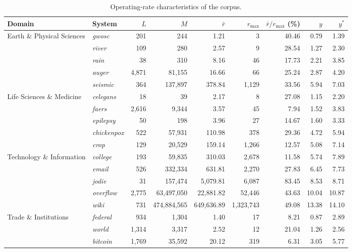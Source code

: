 \documentclass{article}
\begin{document}
\clearpage
\begin{table}[H]
\centering
\footnotesize
\captionsetup{position=top,skip=12pt}
\caption{Operating-rate characteristics of the corpus.}
\label{tab:si-rates}
\begin{tabularx}{\linewidth}{@{}Xlrrrrrrr@{}}
\toprule
Domain & System & $L$ & $M$ & $\bar{r}$ & $r_{\max}$ & $\bar{r}/r_{\max}$ (\%) & $y$ & $y^{*}$ \\
\midrule
Earth \& Physical Sciences & \textit{gwosc} & 201 & 244 & 1.21 & 3 & 40.46 & 0.79 & 1.39 \\
 & \textit{river} & 109 & 280 & 2.57 & 9 & 28.54 & 1.27 & 2.30 \\
 & \textit{rain} & 38 & 310 & 8.16 & 46 & 17.73 & 2.21 & 3.85 \\
 & \textit{auger} & 4{,}871 & 81{,}155 & 16.66 & 66 & 25.24 & 2.87 & 4.20 \\
 & \textit{seismic} & 364 & 137{,}897 & 378.84 & 1{,}129 & 33.56 & 5.94 & 7.03 \\
\addlinespace
Life Sciences \& Medicine & \textit{celegans} & 18 & 39 & 2.17 & 8 & 27.08 & 1.15 & 2.20 \\
 & \textit{faers} & 2{,}616 & 9{,}344 & 3.57 & 45 & 7.94 & 1.52 & 3.83 \\
 & \textit{epilepsy} & 50 & 198 & 3.96 & 27 & 14.67 & 1.60 & 3.33 \\
 & \textit{chickenpox} & 522 & 57{,}931 & 110.98 & 378 & 29.36 & 4.72 & 5.94 \\
 & \textit{crop} & 129 & 20{,}529 & 159.14 & 1{,}266 & 12.57 & 5.08 & 7.14 \\
\addlinespace
Technology \& Information & \textit{college} & 193 & 59{,}835 & 310.03 & 2{,}678 & 11.58 & 5.74 & 7.89 \\
 & \textit{email} & 526 & 332{,}334 & 631.81 & 2{,}270 & 27.83 & 6.45 & 7.73 \\
 & \textit{jodie} & 31 & 157{,}474 & 5{,}079.81 & 6{,}087 & 83.45 & 8.53 & 8.71 \\
 & \textit{overflow} & 2{,}775 & 63{,}497{,}050 & 22{,}881.82 & 52{,}446 & 43.63 & 10.04 & 10.87 \\
 & \textit{wiki} & 731 & 474{,}884{,}565 & 649{,}636.89 & 1{,}323{,}743 & 49.08 & 13.38 & 14.10 \\
\addlinespace
Trade \& Institutions & \textit{federal} & 934 & 1{,}304 & 1.40 & 17 & 8.21 & 0.87 & 2.89 \\
 & \textit{world} & 1{,}314 & 3{,}317 & 2.52 & 12 & 21.04 & 1.26 & 2.56 \\
 & \textit{bitcoin} & 1{,}769 & 35{,}592 & 20.12 & 319 & 6.31 & 3.05 & 5.77 \\

\end{tabularx}
\end{table}
\end{document}
